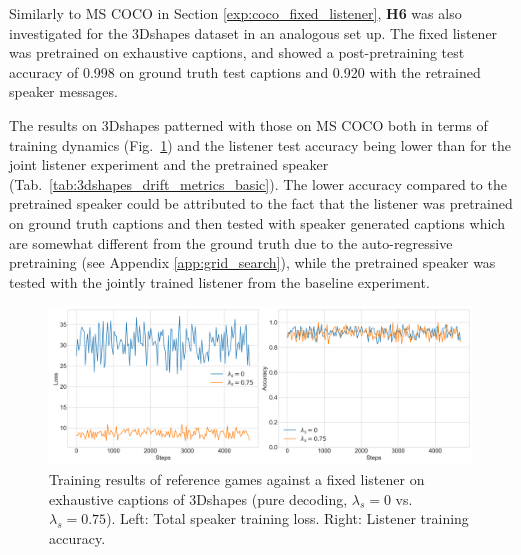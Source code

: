 Similarly to MS COCO in Section \ref{exp:coco_fixed_listener}, \textbf{H6} was also investigated for the 3Dshapes dataset in an analogous set up. The fixed listener was pretrained on exhaustive captions, and showed a post-pretraining test accuracy of 0.998 on ground truth test captions and 0.920 with the retrained speaker messages. 

The results on 3Dshapes patterned with those on MS COCO both in terms of training dynamics (Fig.~\ref{fig:3dshapes_fixed_listener_0_075_speaker_losses_listener_acc}) and the listener test accuracy being lower than for the joint listener experiment and the pretrained speaker (Tab.~\ref{tab:3dshapes_drift_metrics_basic}). The lower accuracy compared to the pretrained speaker could be attributed to the fact that the listener was pretrained on ground truth captions and then tested with speaker generated captions which are somewhat different from the ground truth due to the auto-regressive pretraining (see Appendix \ref{app:grid_search}), while the pretrained speaker was tested with the jointly trained listener from the baseline experiment.
\begin{figure}
	\centering
	\includegraphics[width=\linewidth]{images/3dshapes_fixedListener_baseline_random_0_075_losses.png}
	\caption{Training results of reference games against a fixed listener on exhaustive captions of 3Dshapes (pure decoding, $\lambda_s=0$ vs. $\lambda_s=0.75$). Left: Total speaker training loss. Right: Listener training accuracy.}
	\label{fig:3dshapes_fixed_listener_0_075_speaker_losses_listener_acc}
\end{figure}

